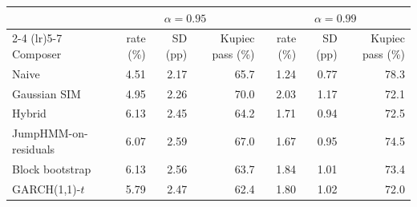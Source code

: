 \begin{tabular}{lrrrrrr}
\toprule
 & \multicolumn{3}{c}{$\alpha = 0.95$} & \multicolumn{3}{c}{$\alpha = 0.99$} \\
\cmidrule(lr){2-4} \cmidrule(lr){5-7}
Composer & rate (\%) & SD (pp) & Kupiec pass (\%) & rate (\%) & SD (pp) & Kupiec pass (\%) \\
\midrule
Naive & 4.51 & 2.17 & 65.7 & 1.24 & 0.77 & 78.3 \\
Gaussian SIM & 4.95 & 2.26 & 70.0 & 2.03 & 1.17 & 72.1 \\
Hybrid & 6.13 & 2.45 & 64.2 & 1.71 & 0.94 & 72.5 \\
JumpHMM-on-residuals & 6.07 & 2.59 & 67.0 & 1.67 & 0.95 & 74.5 \\
Block bootstrap & 6.13 & 2.56 & 63.7 & 1.84 & 1.01 & 73.4 \\
GARCH(1,1)-$t$ & 5.79 & 2.47 & 62.4 & 1.80 & 1.02 & 72.0 \\
\bottomrule
\end{tabular}

